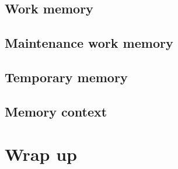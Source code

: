 \subsection{Work memory}
\subsection{Maintenance work memory}
\subsection{Temporary memory}


\subsection{Memory context}

\section{Wrap up}